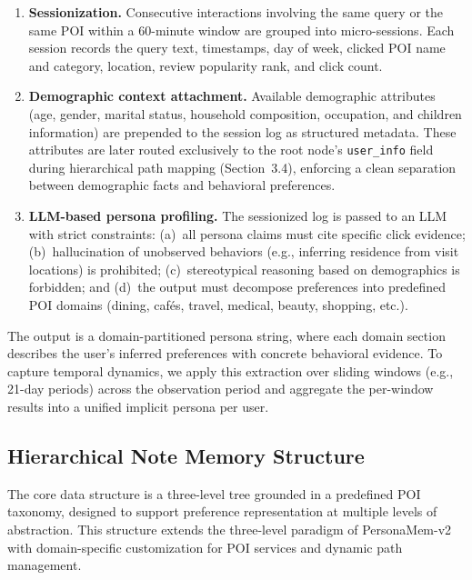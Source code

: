 \documentclass[manuscript,screen,review]{acmart}
\begin{document}
\begin{enumerate}
    \item \textbf{Sessionization.} Consecutive interactions involving the same query or the same POI within a 60-minute window are grouped into micro-sessions. Each session records the query text, timestamps, day of week, clicked POI name and category, location, review popularity rank, and click count.

    \item \textbf{Demographic context attachment.} Available demographic attributes (age, gender, marital status, household composition, occupation, and children information) are prepended to the session log as structured metadata. These attributes are later routed exclusively to the root node's \texttt{user\_info} field during hierarchical path mapping (Section~3.4), enforcing a clean separation between demographic facts and behavioral preferences.

    \item \textbf{LLM-based persona profiling.} The sessionized log is passed to an LLM with strict constraints: (a)~all persona claims must cite specific click evidence; (b)~hallucination of unobserved behaviors (e.g., inferring residence from visit locations) is prohibited; (c)~stereotypical reasoning based on demographics is forbidden; and (d)~the output must decompose preferences into predefined POI domains (dining, caf\'{e}s, travel, medical, beauty, shopping, etc.).
\end{enumerate}

The output is a domain-partitioned persona string, where each domain section describes the user's inferred preferences with concrete behavioral evidence. To capture temporal dynamics, we apply this extraction over sliding windows (e.g., 21-day periods) across the observation period and aggregate the per-window results into a unified implicit persona per user.


\subsection{Hierarchical Note Memory Structure}

The core data structure is a three-level tree grounded in a predefined POI taxonomy, designed to support preference representation at multiple levels of abstraction. This structure extends the three-level paradigm of PersonaMem-v2~\cite{personamem-v2} with domain-specific customization for POI services and dynamic path management.
\end{document}
